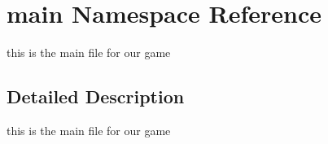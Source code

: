 \hypertarget{namespacemain}{}\section{main Namespace Reference}
\label{namespacemain}


this is the main file for our game  




\subsection{Detailed Description}
this is the main file for our game 